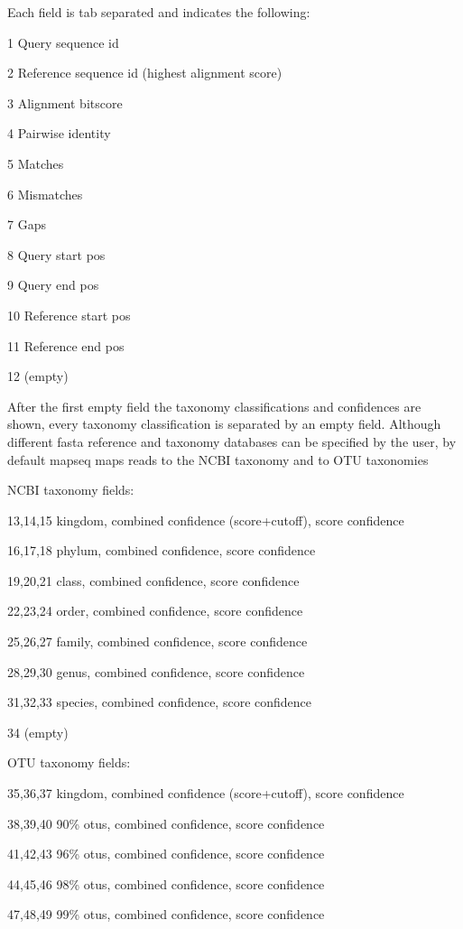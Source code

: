 \documentclass[10pt,a4paper]{article}
\begin{document}
Each field is tab separated and indicates the following:

1       Query sequence id

2       Reference sequence id (highest alignment score)

3       Alignment bitscore

4       Pairwise identity

5       Matches

6       Mismatches

7       Gaps

8       Query start pos

9       Query end pos

10      Reference start pos

11      Reference end pos

12      (empty)

After the first empty field the taxonomy classifications and confidences are shown, every taxonomy classification is separated by an empty field.
Although different fasta reference and taxonomy databases can be specified by the user, by default mapseq maps reads to the NCBI taxonomy and to OTU taxonomies

NCBI taxonomy fields:

13,14,15        kingdom, combined confidence (score+cutoff), score confidence

16,17,18        phylum, combined confidence, score confidence

19,20,21        class, combined confidence, score confidence

22,23,24        order, combined confidence, score confidence

25,26,27        family, combined confidence, score confidence

28,29,30        genus, combined confidence, score confidence

31,32,33        species, combined confidence, score confidence

34      (empty)

OTU taxonomy fields:

35,36,37        kingdom, combined confidence (score+cutoff), score confidence

38,39,40        90\% otus, combined confidence, score confidence

41,42,43        96\% otus, combined confidence, score confidence

44,45,46        98\% otus, combined confidence, score confidence

47,48,49        99\% otus, combined confidence, score confidence
\end{document}
